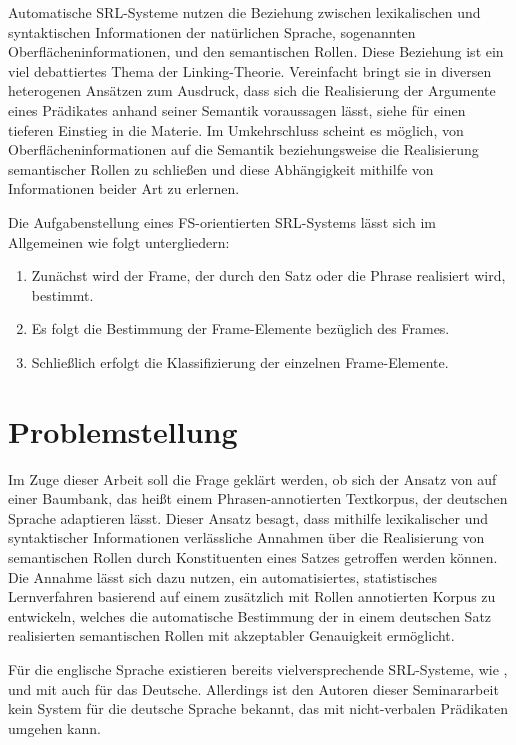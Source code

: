 \documentclass[12pt]{article}
\begin{document}
Automatische SRL-Systeme nutzen die Beziehung zwischen lexikalischen und syntaktischen Informationen der natürlichen Sprache, sogenannten Oberflächeninformationen, und den semantischen Rollen. Diese Beziehung ist ein viel debattiertes Thema der Linking-Theorie. Vereinfacht bringt sie in diversen heterogenen Ansätzen zum Ausdruck, dass sich die Realisierung der Argumente eines Prädikates anhand seiner Semantik voraussagen lässt, siehe \cite{levinrappaport} für einen tieferen Einstieg in die Materie. Im Umkehrschluss scheint es möglich, von Oberflächeninformationen auf die Semantik beziehungsweise die Realisierung semantischer Rollen zu schließen und diese Abhängigkeit mithilfe von Informationen beider Art zu erlernen.\citep{gildea}

Die Aufgabenstellung eines FS-orientierten SRL-Systems lässt sich im Allgemeinen
wie folgt untergliedern:
\begin{enumerate}
\item Zunächst wird der Frame, der durch den Satz oder die Phrase realisiert wird, bestimmt.
\item Es folgt die Bestimmung der Frame-Elemente bezüglich des Frames. 
\item Schließlich erfolgt die Klassifizierung der einzelnen Frame-Elemente.
\end{enumerate}

\section{Problemstellung}

Im Zuge dieser Arbeit soll die Frage geklärt werden, ob sich der Ansatz von \cite{gildea} auf einer Baumbank, das heißt einem Phrasen-annotierten Textkorpus, der deutschen Sprache adaptieren lässt. Dieser Ansatz besagt, dass mithilfe lexikalischer und syntaktischer Informationen verlässliche Annahmen über die Realisierung von semantischen Rollen durch Konstituenten eines Satzes getroffen werden können. Die Annahme lässt sich dazu nutzen, ein automatisiertes, statistisches Lernverfahren basierend auf einem zusätzlich mit Rollen annotierten Korpus zu entwickeln, welches die automatische Bestimmung der in einem deutschen Satz realisierten semantischen Rollen mit akzeptabler Genauigkeit ermöglicht.

Für die englische Sprache existieren bereits vielversprechende SRL-Systeme, wie \cite{das_semafor_2010, johansson_lth_2007, gildea}, und mit \cite{erk2006shalmaneser} auch für das Deutsche. Allerdings ist den Autoren dieser Seminararbeit kein System für die deutsche Sprache bekannt, das mit nicht-verbalen Prädikaten umgehen kann.
\end{document}
